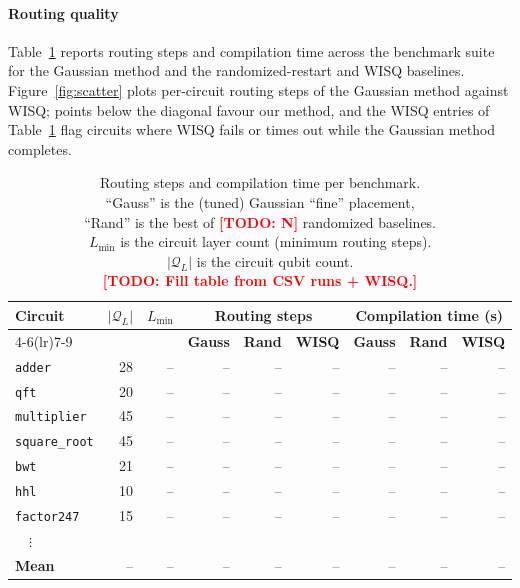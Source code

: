 \documentclass[10pt,conference]{IEEEtran}
\theoremstyle{definition}
\theoremstyle{remark}
\newcommand{\Q}{\mathcal{Q}}            %
\newcommand{\todo}[1]{\textcolor{red}{\textbf{[TODO: #1]}}}
\begin{document}
\paragraph{Routing quality}
Table~\ref{tab:results} reports routing steps and compilation time across the
benchmark suite for the Gaussian method and the randomized-restart and WISQ
baselines.
Figure~\ref{fig:scatter} plots per-circuit routing steps of the Gaussian method
against WISQ; points below the diagonal favour our method, and the WISQ entries
of Table~\ref{tab:results} flag circuits where WISQ fails or times out
while the Gaussian method completes.

\begin{table}[t]
    \centering
    \caption{Routing steps and compilation time per benchmark.\\[2pt]
    ``Gauss'' is the (tuned) Gaussian ``fine'' placement,\\
    ``Rand'' is the best of \todo{N} randomized baselines. \\ 
    $L_{\min}$ is the circuit layer count (minimum routing steps).\\
    $|\Q_L|$ is the circuit qubit count.\\
    \todo{Fill table from CSV runs + WISQ.}
    }
    \label{tab:results}
    \setlength{\tabcolsep}{3pt}
    \scriptsize
    \begin{tabular}{l r r rrr rrr}
        \toprule
        \textbf{Circuit} & \textbf{$|\Q_L|$} & \textbf{$L_{\min}$}
            & \multicolumn{3}{c}{\textbf{Routing steps}}
            & \multicolumn{3}{c}{\textbf{Compilation time (s)}} \\
        \cmidrule(lr){4-6}\cmidrule(lr){7-9}
            & & & \textbf{Gauss} & \textbf{Rand} & \textbf{WISQ}
              & \textbf{Gauss} & \textbf{Rand} & \textbf{WISQ} \\
        \midrule
        \texttt{adder}        & 28 & -- & -- & -- & -- & -- & -- & -- \\
        \texttt{qft}          & 20 & -- & -- & -- & -- & -- & -- & -- \\
        \texttt{multiplier}   & 45 & -- & -- & -- & -- & -- & -- & -- \\
        \texttt{square\_root} & 45 & -- & -- & -- & -- & -- & -- & -- \\
        \texttt{bwt}          & 21 & -- & -- & -- & -- & -- & -- & -- \\
        \texttt{hhl}          & 10 & -- & -- & -- & -- & -- & -- & -- \\
        \texttt{factor247}    & 15 & -- & -- & -- & -- & -- & -- & -- \\
        ~~$\vdots$ & & & & & & & & \\
        \midrule
        \textbf{Mean}    & -- & -- & -- & -- & -- & -- & -- & -- \\
        \bottomrule
    \end{tabular}
    \vspace{-0.2cm}
\end{table}
\end{document}
